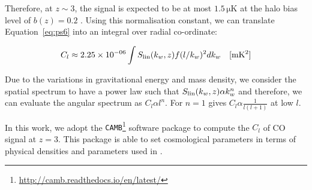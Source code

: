 \noindent  Therefore, at $z \sim 3$, the signal is expected to be at most $1.5\, \mathrm{\mu K}$ at the halo bias level of $b(z) = 0.2$ \citep{2011ApJ...728L..46G}. Using this
normalisation constant, we can translate Equation~\ref{eq:ps6} into an integral over radial co-ordinate:


\begin{equation}  \label{eq:ps7}
  C_{l} \approx 2.25\times 10^{-06}\int S_{\rm lin}(k_{w},z)f(l/k_{w})^2 dk_{w} \quad [\mathrm{mK^2}]
\end{equation}

\noindent  Due to the variations in gravitational energy and mass density, we consider the spatial spectrum to have a power law such that
$S_{\rm lin}(k_{w},z) \alpha k_{w}^n$ and therefore, we can evaluate the angular spectrum as $C_{l} \alpha l^n$.
For $n = 1$ gives $C_{l}  \alpha \frac{1}{l(l+1)}$ at low $l$. 

In this work, we adopt the {\tt CAMB}\footnote{\url{ http://camb.readthedocs.io/en/latest/}} software package to compute the $C_{l}$ of CO signal at $z=3$.
This package is able to set cosmological parameters in terms of physical densities and parameters used in \cite{Ade:2015xua}. %

% 
